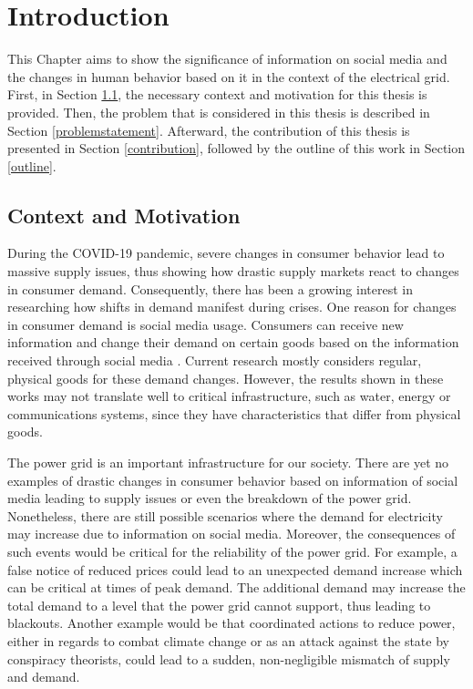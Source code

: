 \chapter{Introduction}

This Chapter aims to show the significance of information on social media and 
the changes in human behavior based on it
in the context of the electrical grid.
First, in Section \ref{contextmotivation}, the necessary context and 
motivation for this thesis is provided.
Then, the problem that is considered in this thesis is described 
in Section \ref{problemstatement}. Afterward, the contribution of this
thesis is presented in Section \ref{contribution}, 
followed by the outline of this work in Section \ref{outline}.

\section{Context and Motivation}
\label{contextmotivation}

During the COVID-19 pandemic, severe changes in consumer behavior
lead to massive supply issues, thus showing how drastic supply markets 
react to changes in consumer demand.
Consequently, there has been a growing interest in researching 
how shifts in demand manifest during crises. 
One reason for changes in consumer demand is 
social media usage. Consumers can receive new information
and change their demand on certain goods based on the information received 
through social media \cite{naeem2021social}.
Current research mostly considers regular, physical 
goods for these demand changes.
However, the results shown in these 
works may not translate well to critical infrastructure,
such as water, energy or communications systems,
since they have characteristics that differ from physical goods.

The power grid is an important infrastructure for our society.
There are yet no examples of drastic changes in consumer behavior
based on information of social media leading to supply issues or
even the breakdown of the power grid. Nonetheless, 
there are still possible scenarios where the demand for
electricity may increase due to information on social media.
Moreover, the consequences of such events would be critical for the
reliability of the power grid.
For example, a false notice of reduced prices 
could lead to an unexpected demand increase which 
can be critical at times of peak demand. 
The additional demand
may increase the total demand to a level that the power grid
cannot support, thus leading to blackouts.
Another example would be that coordinated actions to reduce
power, either in regards to combat climate change \cite{earthday}
or as an attack against the state by conspiracy theorists,
could lead to a sudden, non-negligible mismatch of supply and demand.


